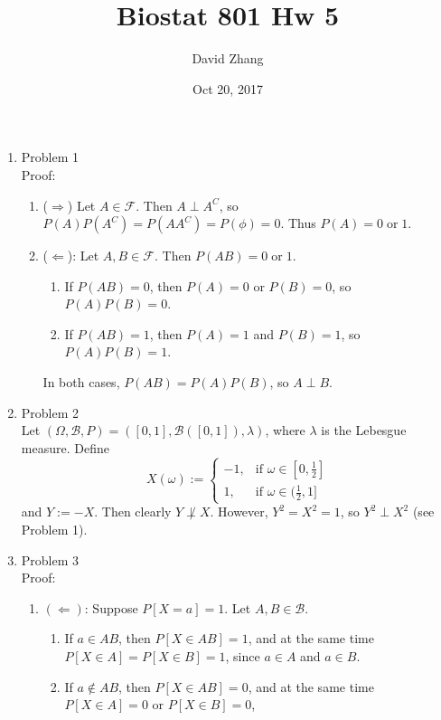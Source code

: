 \documentclass{article}
\title{Biostat 801 Hw 5}
\author{David Zhang}
\date{Oct 20, 2017}
\newcommand{\B}{\mathcal{B}}
\begin{document}
\maketitle

\begin{enumerate}
\item Problem 1 \\
    Proof: 
    \begin{enumerate}
    \item ($\Rightarrow$)
    Let $A \in \mathcal{F}$. 
    Then $A \perp A^C$,
    so $P(A) P(A^C) = P(AA^C) = P(\phi) = 0$.
    Thus $P(A) = 0 \;\text{or}\; 1$. \\
    \item ($\Leftarrow$):
    Let $A, B \in \mathcal{F}$.
    Then $P(AB) = 0 \;\text{or}\; 1$.
    \begin{enumerate}
    \item If $P(AB) = 0$,
    then $P(A) = 0$ or $P(B) = 0$, so $P(A) P(B) = 0$.
    \item If $P(AB) = 1$,
    then $P(A) = 1$ and $P(B) = 1$, so $P(A) P(B) = 1$.
    \end{enumerate}
    In both cases,
    $P(AB) = P(A)P(B)$,
    so $A \perp B$.
    \end{enumerate}
\item Problem 2 \\
    Let $(\Omega, \B, P) = ([0,1], \B([0,1]), \lambda)$,
    where $\lambda$ is the Lebesgue measure.
    Define
    \[
    X(\omega) := 
    \begin{cases}
    -1, & \text{if } \omega \in [0, \frac{1}{2}] \\
    1, & \text{if } \omega \in (\frac{1}{2}, 1]
    \end{cases}
    \]
    and $Y := -X$.
    Then clearly $Y \not\perp X$.
    However, $Y^2 = X^2 = 1$,
    so $Y^2 \perp X^2$ (see Problem 1).
\item Problem 3 \\
Proof:
\begin{enumerate}
\item $(\Leftarrow)$:
    Suppose $P[X = a] = 1$.
    Let $A, B \in \B$.
    \begin{enumerate}
    \item If $a \in AB$,
        then $P[X \in AB] = 1$,
        and at the same time $P[X \in A] = P[X \in B] = 1$,
        since $a \in A$ and $a \in B$.
    \item If $a \notin AB$,
        then $P[X \in AB] = 0$,
        and at the same time $P[X \in A] = 0$ or $P[X \in B] = 0$,

\end{enumerate}
\end{enumerate}
\end{enumerate}
\end{document}
